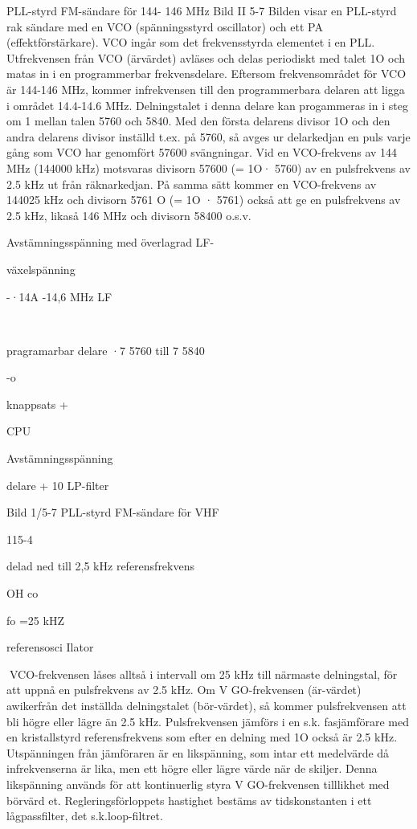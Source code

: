 PLL-styrd FM-sändare för 144- 146 MHz
Bild II 5-7
Bilden visar en PLL-styrd rak sändare med
en VCO (spänningsstyrd oscillator) och ett
PA (effektförstärkare).
VCO ingår som det frekvensstyrda elementet i en PLL. Utfrekvensen från VCO (ärvärdet) avläses och delas periodiskt med
talet 1O och matas in i en programmerbar
frekvensdelare. Eftersom frekvensområdet
för VCO är 144-146 MHz, kommer infrekvensen till den programmerbara delaren att
ligga i området 14.4-14.6 MHz. Delningstalet i denna delare kan progammeras in i steg
om 1 mellan talen 5760 och 5840.
Med den första delarens divisor 1O och
den andra delarens divisor inställd t.ex. på
5760, så avges ur delarkedjan en puls varje
gång som VCO har genomfört 57600 svängningar. Vid en VCO-frekvens av 144 MHz
(144000 kHz) motsvaras divisorn 57600 (=
1O· 5760) av en pulsfrekvens av 2.5 kHz ut
från räknarkedjan. På samma sätt kommer
en VCO-frekvens av 144025 kHz och divisorn 5761 O (= 1O · 5761) också att ge en
pulsfrekvens av 2.5 kHz, likaså 146 MHz
och divisorn 58400 o.s.v.

Avstämningsspänning
med överlagrad LF-

växelspänning

-·14A -14,6 MHz
LF

~

pragramarbar delare
·7 5760 till 7 5840

-o

knappsats
+

CPU

Avstämningsspänning

delare + 10
LP-filter

Bild 1/5-7 PLL-styrd FM-sändare för VHF

115-4

delad ned till 2,5 kHz
referensfrekvens

OH
co

fo =25 kHZ

referensosci Ilator

VCO-frekvensen låses alltså i intervall
om 25 kHz till närmaste delningstal, för att
uppnå en pulsfrekvens av 2.5 kHz. Om
V GO-frekvensen (är-värdet) awikerfrån det
inställda delningstalet (bör-värdet), så kommer pulsfrekvensen att bli högre eller lägre
än 2.5 kHz.
Pulsfrekvensen jämförs i en s.k. fasjämförare med en kristallstyrd referensfrekvens
som efter en delning med 1O också är 2.5
kHz. Utspänningen från jämföraren är en
likspänning, som intar ett medelvärde då
infrekvenserna är lika, men ett högre eller
lägre värde när de skiljer. Denna likspänning
används för att kontinuerlig styra V GO-frekvensen tilllikhet med börvärd et. Regleringsförloppets hastighet bestäms av tidskonstanten i ett lågpassfilter, det s.k.loop-filtret.

